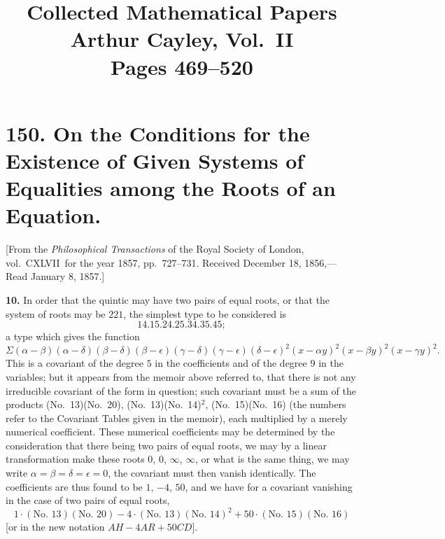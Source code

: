 \documentclass[12pt,a4paper]{article}
\title{\textbf{Collected Mathematical Papers}\\[6pt]
\large Arthur Cayley, Vol.~II\\[12pt]
\normalsize Pages 469--520}
\author{}
\date{}
\theoremstyle{definition}
\begin{document}
\maketitle
\thispagestyle{empty}

\tableofcontents
\newpage


\section*{150. On the Conditions for the Existence of Given Systems of Equalities among the Roots of an Equation.}

[From the \textit{Philosophical Transactions} of the Royal Society of London, vol.~CXLVII\ for the year 1857, pp.~727--731.
Received December 18, 1856,---Read January 8, 1857.]

\bigskip
\noindent\textbf{10.} In order that the quintic may have two pairs of equal roots, or that the system of roots may be $221$, the simplest type to be considered is
\[14.15.24.25.34.35.45;\]
a type which gives the function
\[
\Sigma(\alpha-\beta)(\alpha-\delta)(\beta-\delta)(\beta-\epsilon)(\gamma-\delta)(\gamma-\epsilon)(\delta-\epsilon)^2
(x-\alpha y)^2(x-\beta y)^2(x-\gamma y)^2.
\]
This is a covariant of the degree $5$ in the coefficients and of the degree $9$ in the variables; but it appears from the memoir above referred to, that there is not any irreducible covariant of the form in question; such covariant must be a sum of the products (No.~13)(No.~20), (No.~13)(No.~14)$^2$, (No.~15)(No.~16) (the numbers refer to the Covariant Tables given in the memoir), each multiplied by a merely numerical coefficient. These numerical coefficients may be determined by the consideration that there being two pairs of equal roots, we may by a linear transformation make these roots $0$, $0$, $\infty$, $\infty$, or what is the same thing, we may write $\alpha=\beta=\delta=\epsilon=0$, the covariant must then vanish identically. The coefficients are thus found to be $1$, $-4$, $50$, and we have for a covariant vanishing in the case of two pairs of equal roots,
\[
1 \cdot (\text{No.~13})(\text{No.~20}) - 4 \cdot (\text{No.~13})(\text{No.~14})^2 + 50 \cdot (\text{No.~15})(\text{No.~16})
\]
[or in the new notation $AH - 4AR + 50CD$].
\end{document}
